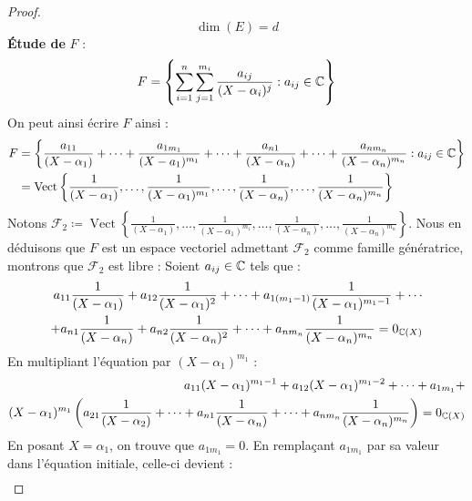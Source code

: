 \begin{proof}
    \[ \dim(E) = d \]
    \textbf{\'Etude de} $F$ :
    \[ F = \left\{ \sum_{i = 1}^{n} \sum_{j = 1}^{m_i} \frac{a_{ij}}{(X - \alpha_i)^{j}} : a_{ij} \in \mathbb{C} \right\} \]
    On peut ainsi écrire $F$ ainsi : 
    \begin{align*}
        F &= \left\{ \frac{a_{11}}{(X - \alpha_1)} + \cdots + \frac{a_{1m_1}}{(X - a_1)^{m_1}} + \cdots + \frac{a_{n1}}{(X - \alpha_n)} + \cdots + \frac{a_{nm_n}}{(X - \alpha_n)^{m_n}} : a_{ij} \in \mathbb{C} \right\} \\
        &= \operatorname{Vect} \left\{ \frac{1}{(X - \alpha_1)}, \ldots, \frac{1}{(X - \alpha_1)^{m_1}}, \ldots, \frac{1}{(X - \alpha_n)}, \ldots, \frac{1}{(X - \alpha_n)^{m_n}}  \right\}
    \end{align*}
    Notons $\mathcal{F}_2 \coloneqq \operatorname{Vect} \left\{ \frac{1}{(X - \alpha_1)}, \ldots, \frac{1}{(X - \alpha_1)^{m_1}}, \ldots, \frac{1}{(X - \alpha_n)}, \ldots, \frac{1}{(X - \alpha_n)^{m_n}}  \right\}$. Nous en déduisons que $F$ est un espace vectoriel admettant $\mathcal{F}_2$ comme famille génératrice, montrons que $\mathcal{F}_2$ est libre : Soient $a_{ij} \in \mathbb{C}$ tels que :
    \begin{align*}
        \begin{split}
            a_{11} \frac{1}{(X - \alpha_1)} + a_{12} \frac{1}{(X - \alpha_1)^2} + \cdots + a_{1(m_1 -1)} \frac{1}{(X - \alpha_1)^{m_1 - 1}} + \cdots \\
            + a_{n1} \frac{1}{(X - \alpha_n)} + a_{n2} \frac{1}{(X - \alpha_n)^2} + \cdots + a_{nm_n} \frac{1}{(X - \alpha_n)^{m_n}} = 0_{\mathbb{C}(X)}
        \end{split}
    \end{align*}
    En multipliant l'équation par $(X - \alpha_1)^{m_1}$ :
    \begin{align*}
        \begin{split}
            a_{11} (X - \alpha_1)^{m_1 - 1} + a_{12} (X - \alpha_1)^{m_1 - 2} + \cdots + a_{1m_1} + \\
            (X - \alpha_1)^{m_1}
            \left( 
            a_{21} \frac{1}{(X - \alpha_2)} + \cdots + a_{n1} \frac{1}{(X - \alpha_n)} + \cdots + a_{nm_n} \frac{1}{(X - \alpha_n)^{m_n}}
            \right)
            = 0_{\mathbb{C}(X)}
         \end{split}
    \end{align*}
    En posant $X = \alpha_1$, on trouve que $a_{1m_1} = 0$.
    En remplaçant $a_{1m_1}$ par sa valeur dans l'équation initiale, celle-ci devient : 
    \begin{align*}

\end{align*}
\end{proof}
